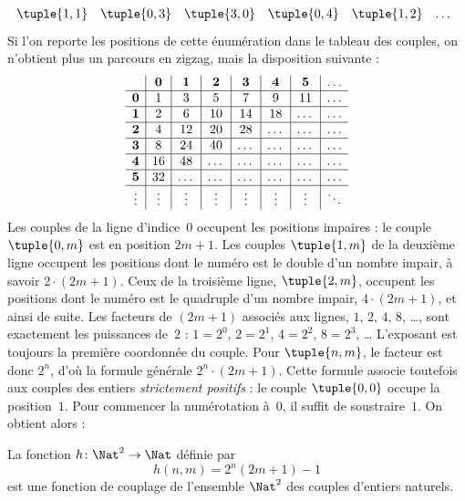 \documentclass[11pt,a4paper,openany]{memoir}
\begin{document}
\begin{explain}
{\[\begin{array}{@{}cc c c c c c c c c c@{}}
\tuple{1,1} & \tuple{0,3} & \tuple{3,0}  & \tuple{0,4} &  \tuple{1,2} & \dots \\
\end{array}
\]}
Si l’on reporte les positions de cette énumération dans le tableau
des couples, on n’obtient plus un parcours en zigzag, mais la disposition
suivante :
\[
\begin{array}{ c | c | c | c | c | c | c | c }
& \mathbf 0 & \mathbf 1 & \mathbf 2 & \mathbf 3 & \mathbf 4 & \mathbf 5 & \dots \\
\hline
\mathbf 0 & 1 & 3 & 5 & 7 & 9 & 11 & \dots \\
\hline
\mathbf 1 & 2 & 6 & 10 & 14 & 18 & \dots & \dots \\
\hline
\mathbf 2 & 4 & 12 & 20 & 28 & \dots & \dots & \dots \\
\hline
\mathbf 3 & 8 & 24 & 40 & \dots & \dots & \dots & \dots \\
\hline
\mathbf 4 & 16 & 48 & \dots & \dots & \dots & \dots & \dots \\
\hline
\mathbf 5 & 32 & \dots & \dots & \dots & \dots & \dots & \dots \\
\hline
\vdots & \vdots & \vdots & \vdots & \vdots & \vdots & \vdots & \ddots\\
\end{array}
\]
Les couples de la ligne d’indice~$0$ occupent les positions impaires :
le couple $\tuple{0,m}$ est en position $2m+1$. Les couples
$\tuple{1,m}$ de la deuxième ligne occupent les positions dont
le numéro est le double d’un nombre impair, à savoir $2 \cdot (2m+1)$.
Ceux de la troisième ligne, $\tuple{2,m}$, occupent les positions
dont le numéro est le quadruple d’un nombre impair, $4 \cdot (2m+1)$,
et ainsi de suite. Les facteurs de $(2m+1)$ associés aux lignes,
$1$, $2$, $4$, $8$, \dots, sont exactement les puissances de~$2$ :
$1= 2^0$, $2 = 2^1$, $4 = 2^2$, $8 = 2^3$, \dots\@
L’exposant est toujours la première coordonnée du couple.
Pour $\tuple{n,m}$, le facteur est donc $2^n$, d’où la formule
générale $2^n \cdot (2m+1)$. Cette formule associe toutefois
aux couples des entiers \emph{strictement positifs} : le couple
$\tuple{0,0}$ occupe la position~$1$. Pour commencer la numérotation
à~$0$, il suffit de soustraire~$1$. On obtient alors :
\end{explain}

\begin{ex}
La fonction $h\colon \Nat^2 \to \Nat$ définie par
\[
h(n,m) = 2^n (2m+1) - 1
\]
est une fonction de couplage de l’ensemble $\Nat^2$ des couples
d’entiers naturels.
\end{ex}
\end{document}
